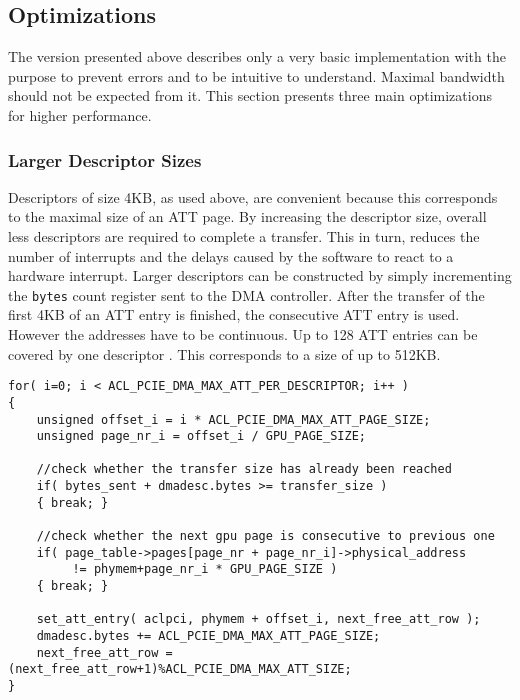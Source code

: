 \subsection{Optimizations}

\label{sec:optimizations}

The version presented above describes only a very basic implementation with the purpose to prevent errors and to be intuitive to understand.
Maximal bandwidth should not be expected from it.
This section presents three main optimizations for higher performance.



\subsubsection*{Larger Descriptor Sizes}

Descriptors of size 4KB, as used above, are convenient because this corresponds to the maximal size of an ATT page.
By increasing the descriptor size, overall less descriptors are required to complete a transfer.
This in turn, reduces the number of interrupts and the delays caused by the software to react to a hardware interrupt.
Larger descriptors can be constructed by simply incrementing the \texttt{bytes} count register sent to the DMA controller.
After the transfer of the first 4KB of an ATT entry is finished, the consecutive ATT entry is used.
However the addresses have to be continuous.
Up to 128 ATT entries can be covered by one descriptor \cite{altera_driver}.
This corresponds to a size of up to 512KB.


\begin{lstlisting}[label=rdma_send_many, caption=Setting the size of a descriptor as large as possible]
for( i=0; i < ACL_PCIE_DMA_MAX_ATT_PER_DESCRIPTOR; i++ )
{
	unsigned offset_i = i * ACL_PCIE_DMA_MAX_ATT_PAGE_SIZE;
	unsigned page_nr_i = offset_i / GPU_PAGE_SIZE;
	
	//check whether the transfer size has already been reached
	if( bytes_sent + dmadesc.bytes >= transfer_size )
	{ break; }
	
	//check whether the next gpu page is consecutive to previous one
	if( page_table->pages[page_nr + page_nr_i]->physical_address 
	     != phymem+page_nr_i * GPU_PAGE_SIZE )
	{ break; }
	
	set_att_entry( aclpci, phymem + offset_i, next_free_att_row );
	dmadesc.bytes += ACL_PCIE_DMA_MAX_ATT_PAGE_SIZE;
	next_free_att_row = (next_free_att_row+1)%ACL_PCIE_DMA_MAX_ATT_SIZE;
}
\end{lstlisting}








